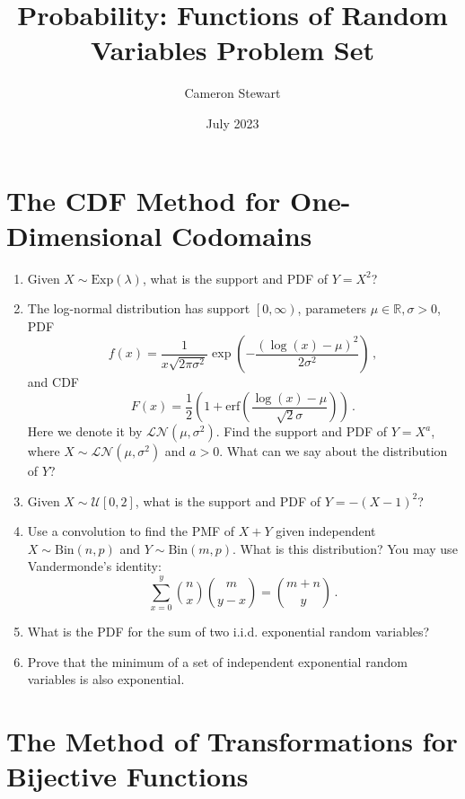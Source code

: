 \documentclass{article}
\title{Probability: Functions of Random Variables Problem Set}
\author{Cameron Stewart}
\date{July 2023}
\begin{document}
\maketitle

\section{The CDF Method for One-Dimensional Codomains}

\begin{enumerate}
    \item Given \(X\sim \mathrm{Exp}\left(\lambda\right)\), what is the support and PDF of \(Y = X^2\)?
    \item The log-normal distribution has support \(\left[0,\infty\right)\), parameters \(\mu \in \mathbb{R}, \sigma > 0\), PDF
    \begin{equation*}
        f\left(x\right) = \frac{1}{x\sqrt{2\pi\sigma^2}}\exp\left({-\frac{\left(\log\left(x\right) - \mu\right)^2}{2\sigma^2}}\right)\,,
    \end{equation*}
    and CDF
    \begin{equation*}
        F\left(x\right) = \frac{1}{2}\left(1 + \mathrm{erf}\left(\frac{\log\left(x\right) - \mu}{\sqrt{2}\sigma}\right)\right)\,.
    \end{equation*}
    Here we denote it by \(\mathcal{LN}\left(\mu,\sigma^2\right)\). Find the support and PDF of \(Y = X^a\), where \(X\sim \mathcal{LN}\left(\mu,\sigma^2\right)\) and \(a > 0\). What can we say about the distribution of \(Y\)?
    \item Given \(X\sim \mathcal{U}\left[0,2\right]\), what is the support and PDF of \(Y = -(X-1)^2\)?
    \item Use a convolution to find the PMF of \(X + Y\) given independent \(X\sim\mathrm{Bin}\left(n, p\right)\) and \(Y\sim\mathrm{Bin}\left(m, p\right)\). What is this distribution? You may use Vandermonde's identity:
    \begin{equation*}
        \sum_{x=0}^y \binom{n}{x}\binom{m}{y-x} = \binom{m+n}{y}\,.
    \end{equation*}
    \item What is the PDF for the sum of two i.i.d. exponential random variables?
    \item Prove that the minimum of a set of independent exponential random variables is also exponential.
\end{enumerate}

\section{The Method of Transformations for Bijective Functions}
\end{document}
